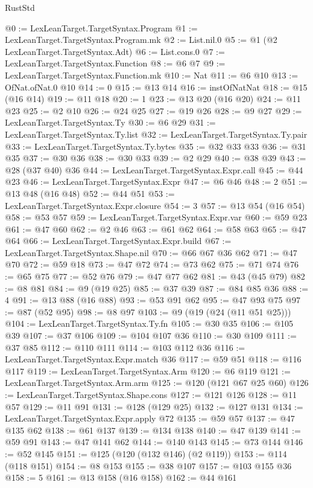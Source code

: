 \begin{lexlean}{RustStd}
\begin{coremodule}
{\begin{coremodule}
{{{{{{{{{{@0 := LexLeanTarget.TargetSyntax.Program
@1 := LexLeanTarget.TargetSyntax.Program.mk
@2 := List.nil.{0}
@5 := @1 (@2 LexLeanTarget.TargetSyntax.Adt)
@6 := List.cons.{0}
@7 := LexLeanTarget.TargetSyntax.Function
@8 := @6 @7
@9 := LexLeanTarget.TargetSyntax.Function.mk
@10 := Nat
@11 := @6 @10
@13 := OfNat.ofNat.{0} @10
@14 := 0
@15 := @13 @14
@16 := instOfNatNat
@18 := @15 (@16 @14)
@19 := @11 @18
@20 := 1
@23 := @13 @20 (@16 @20)
@24 := @11 @23
@25 := @2 @10
@26 := @24 @25
@27 := @19 @26
@28 := @9 @27
@29 := LexLeanTarget.TargetSyntax.Ty
@30 := @6 @29
@31 := LexLeanTarget.TargetSyntax.Ty.list
@32 := LexLeanTarget.TargetSyntax.Ty.pair
@33 := LexLeanTarget.TargetSyntax.Ty.bytes
@35 := @32 @33 @33
@36 := @31 @35
@37 := @30 @36
@38 := @30 @33
@39 := @2 @29
@40 := @38 @39
@43 := @28 (@37 @40) @36
@44 := LexLeanTarget.TargetSyntax.Expr.call
@45 := @44 @23
@46 := LexLeanTarget.TargetSyntax.Expr
@47 := @6 @46
@48 := 2
@51 := @13 @48 (@16 @48)
@52 := @44 @51
@53 := LexLeanTarget.TargetSyntax.Expr.closure
@54 := 3
@57 := @13 @54 (@16 @54)
@58 := @53 @57
@59 := LexLeanTarget.TargetSyntax.Expr.var
@60 := @59 @23
@61 := @47 @60
@62 := @2 @46
@63 := @61 @62
@64 := @58 @63
@65 := @47 @64
@66 := LexLeanTarget.TargetSyntax.Expr.build
@67 := LexLeanTarget.TargetSyntax.Shape.nil
@70 := @66 @67 @36 @62
@71 := @47 @70
@72 := @59 @18
@73 := @47 @72
@74 := @73 @62
@75 := @71 @74
@76 := @65 @75
@77 := @52 @76
@79 := @47 @77 @62
@81 := @43 (@45 @79)
@82 := @8 @81
@84 := @9 (@19 @25)
@85 := @37 @39
@87 := @84 @85 @36
@88 := 4
@91 := @13 @88 (@16 @88)
@93 := @53 @91 @62
@95 := @47 @93 @75
@97 := @87 (@52 @95)
@98 := @8 @97
@103 := @9 (@19 (@24 (@11 @51 @25)))
@104 := LexLeanTarget.TargetSyntax.Ty.fn
@105 := @30 @35
@106 := @105 @39
@107 := @37 @106
@109 := @104 @107 @36
@110 := @30 @109
@111 := @37 @85
@112 := @110 @111
@114 := @103 @112 @36
@116 := LexLeanTarget.TargetSyntax.Expr.match @36
@117 := @59 @51
@118 := @116 @117
@119 := LexLeanTarget.TargetSyntax.Arm
@120 := @6 @119
@121 := LexLeanTarget.TargetSyntax.Arm.arm
@125 := @120 (@121 @67 @25 @60)
@126 := LexLeanTarget.TargetSyntax.Shape.cons
@127 := @121 @126
@128 := @11 @57
@129 := @11 @91
@131 := @128 (@129 @25)
@132 := @127 @131
@134 := LexLeanTarget.TargetSyntax.Expr.apply @72
@135 := @59 @57
@137 := @47 @135 @62
@138 := @61 @137
@139 := @134 @138
@140 := @47 @139
@141 := @59 @91
@143 := @47 @141 @62
@144 := @140 @143
@145 := @73 @144
@146 := @52 @145
@151 := @125 (@120 (@132 @146) (@2 @119))
@153 := @114 (@118 @151)
@154 := @8 @153
@155 := @38 @107
@157 := @103 @155 @36
@158 := 5
@161 := @13 @158 (@16 @158)
@162 := @44 @161
}}}}}}}}}}
\end{coremodule}}
\end{coremodule}
\end{lexlean}
